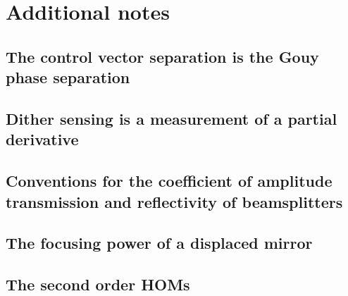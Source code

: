 \chapter{Additional notes}

\section{The control vector separation is the Gouy phase separation}
\section{Dither sensing is a measurement of a partial derivative}

\section{Conventions for the coefficient of amplitude transmission and reflectivity of beamsplitters}

\section{The focusing power of a displaced mirror}

\section{The second order HOMs}

